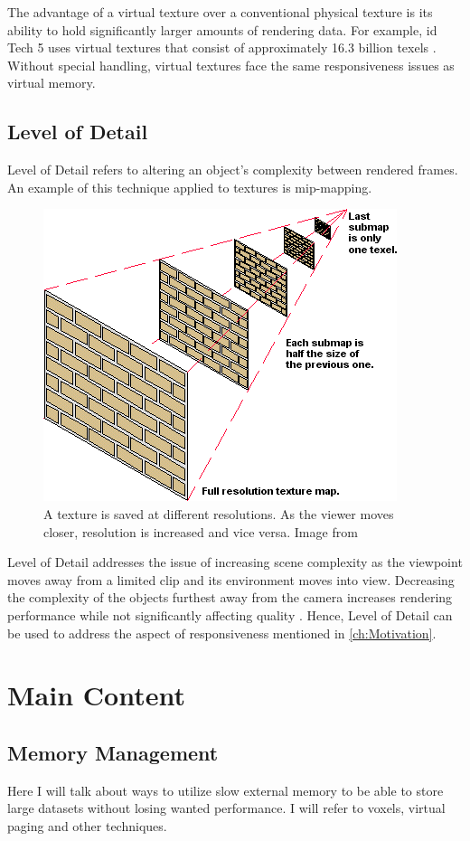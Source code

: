 The advantage of a virtual texture over a conventional physical texture is its ability to hold significantly larger amounts of rendering data. For example, id Tech 5 uses virtual textures that consist of approximately 16.3 billion texels \cite{van2009id}. Without special handling, virtual textures face the same responsiveness issues as virtual memory.

\section{Level of Detail}

Level of Detail refers to altering an object's complexity between rendered frames. An example of this technique applied to textures is mip-mapping. 

\begin{figure}[h]
  \begin{center}
    \includegraphics[width=.3\textwidth]{logos/mipmap_example.png}
    \caption{A texture is saved at different resolutions. As the viewer moves closer, resolution is increased and vice versa. Image from \cite{PCMag:DefMipMapping:2017}}
  \end{center}
\end{figure}

Level of Detail addresses the issue of increasing scene complexity as the viewpoint moves away from a limited clip and its environment moves into view. Decreasing the complexity of the objects furthest away from the camera increases rendering performance while not significantly affecting quality \cite{Unity:LevelOfDetail:2017}. Hence, Level of Detail can be used to address the aspect of responsiveness mentioned in \ref{ch:Motivation}.

\chapter{Main Content}
\label{ch:MainContent}

\section{Memory Management}
Here I will talk about ways to utilize slow external memory to be able to store large datasets without losing wanted performance. I will refer to voxels, virtual paging and other techniques.

